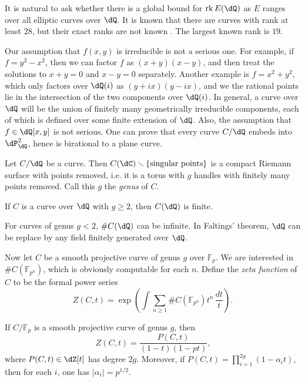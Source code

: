 \documentclass{article}
\begin{document}
It is natural to ask whether there is a global bound for $\rank E(\dQ)$ as 
$E$ ranges over all elliptic curves over $\dQ$. 
It is known that there are curves with rank at least $28$, but their exact 
ranks are not known \cite{du}. The largest known rank is $19$. 

Our assumption that $f(x,y)$ is irreducible is not a serious one. For example, 
if $f=y^2-x^2$, then we can factor $f$ as $(x+y)(x-y)$, and then treat the 
solutions to $x+y=0$ and $x-y=0$ separately. Another example is $f=x^2+y^2$, 
which only factors over $\dQ(i)$ as $(y+i x)(y-i x)$, and we the rational 
points lie in the intersection of the two components over $\dQ(i)$. In general, 
a curve over $\dQ$ will be the union of finitely many geometrically irreducible 
components, each of which is defined over some finite extension of $\dQ$. Also, 
the assumption that $f\in \dQ[x,y]$ is not serious. One can prove that every 
curve $C/\dQ$ embeds into $\dP^2_\dQ$, hence is birational to a plane curve. 

Let $C/\dQ$ be a curve. Then 
$C(\dC)\smallsetminus \{\text{singular points}\}$ is a compact Riemann 
surface with points removed, i.e. it is a torus with $g$ handles with finitely 
many points removed. Call this $g$ the \emph{genus} of $C$. 

\begin{theorem}
If $C$ is a curve over $\dQ$ with $g\geqslant 2$, then $C(\dQ)$ 
is finite. 
\end{theorem}

For curves of genus $g<2$, $\# C(\dQ)$ can be infinite. In Faltings' 
theorem, $\dQ$ can be replace by any field finitely generated over 
$\dQ$. 

Now let $C$ be a smooth projective curve of genus $g$ over $\mathbb{F}_p$. 
We are interested in $\#C(\mathbb{F}_{p^n})$, which is obviously computable 
for each $n$. Define the \emph{zeta function} of $C$ to be the formal power 
series 
\[
  Z(C,t) = \exp\left( \int\sum_{n\geqslant 1} \# C(\mathbb{F}_{p^n}) t^n\, \frac{dt}{t}\right) \text{.}
\]

\begin{theorem}[Weil]\label{thm:Weil-curve}
If $C/\mathbb{F}_p$ is a smooth projective curve of genus $g$, then 
\[
  Z(C,t) = \frac{P(C,t)}{(1-t)(1-p t)} \text{,}
\]
where $P(C,t)\in \dZ[t]$ has degree $2 g$. Moreover, if 
$P(C,t) = \prod_{i=1}^{2 g} (1-\alpha_i t)$, then for each $i$, one has 
$|\alpha_i|=p^{1/2}$. 
\end{theorem}
\end{document}
